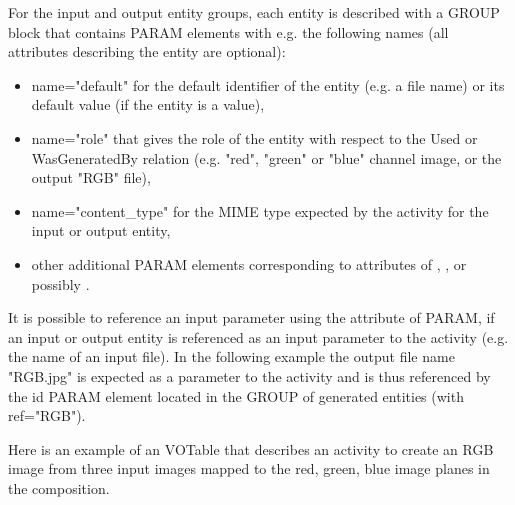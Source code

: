 For the input and output entity groups, each entity is described with a GROUP block that contains PARAM elements with e.g. the following names (all attributes describing the entity are optional):
\begin{itemize}
 \item name="default" for the default identifier of the entity (e.g. a file name) or its default value (if the entity is a value),
 \item name="role" that gives the role of the entity with respect to the Used or WasGeneratedBy relation (e.g. "red", "green" or "blue" channel image, or the output "RGB" file),
 \item name="content\_type" for the MIME type expected by the activity for the input or output entity,
 \item other additional PARAM elements corresponding to attributes of , ,  or possibly .
 \end{itemize} 
It is possible to reference an input parameter using the  attribute of PARAM, if an input or output entity is referenced as an input parameter to the activity (e.g. the name of an input file). In the following example the output file name "RGB.jpg" is expected as a parameter to the activity and is thus referenced by the id PARAM element located in the GROUP of generated entities (with ref="RGB").

Here is an example of an  VOTable that describes an activity to create an RGB image from three input images mapped to the red, green, blue image planes in the composition. 

